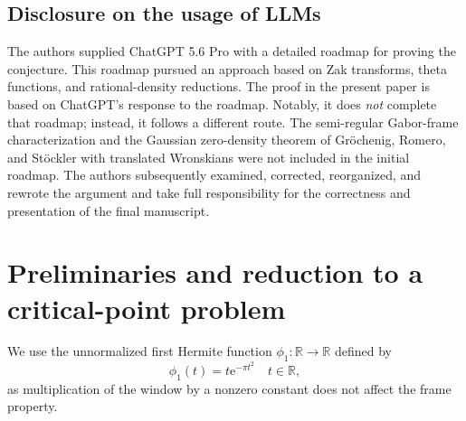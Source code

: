 \documentclass[11pt]{amsart}
\numberwithin{equation}{section}
\theoremstyle{definition}
\theoremstyle{remark}
\newcommand{\R}{\mathbb R}
\newcommand{\e}{\mathrm e}
\begin{document}
\subsection{Disclosure on the usage of LLMs}

The authors supplied ChatGPT 5.6 Pro with a detailed roadmap for proving the conjecture. This roadmap pursued an approach based on Zak transforms, theta functions, and rational-density reductions. The proof in the present paper is based on ChatGPT's response to the roadmap.  Notably, it does \emph{not} complete that roadmap; instead, it follows a different route. The semi-regular Gabor-frame characterization and the Gaussian zero-density theorem of Gröchenig, Romero, and Stöckler with translated Wronskians were not included in the initial roadmap. The authors subsequently examined, corrected, reorganized, and rewrote the argument and take full responsibility for the correctness and presentation of the final manuscript. 

\section{Preliminaries and reduction to a critical-point problem}\label{sec:preliminaries}
We use the unnormalized first Hermite function $\phi_1\colon\R\to\R$ defined by
\begin{equation}\label{eq:phi1}
  \phi_1(t)=t\e^{-\pi t^2}
  \quad t\in\R,
\end{equation}
as multiplication of the window by a nonzero constant does not affect the frame property.
\end{document}
